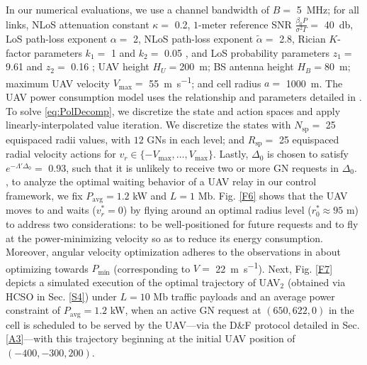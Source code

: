 \documentclass[10pt, twocolumn]{IEEEtran}
\theoremstyle{plain}
\theoremstyle{definition}
\theoremstyle{remark}
\begin{document}
In our numerical evaluations, we use a channel bandwidth of $B=$ \qty[mode=text]{5}{\mega\hertz}; for all links, NLoS attenuation constant $\kappa=$ \qty[mode=text]{0.2}{}, $1$-meter reference SNR $\frac{\beta_{0}P}{\sigma^{2}\Gamma}=$ \qty[mode=text]{40}{\decibel}, LoS path-loss exponent $\alpha=$ \qty[mode=text]{2}{}, NLoS path-loss exponent $\tilde{\alpha}=$ \qty[mode=text]{2.8}{}, Rician $K$-factor parameters $k_{1}=$ \qty[mode=text]{1}{} and $k_{2}=$ \qty[mode=text]{0.05}{} \cite{Rician}, and LoS probability parameters $z_{1}=$ \qty[mode=text]{9.61}{} and $z_{2}=$ \qty[mode=text]{0.16}{} \cite{OptimalAltitude}; UAV height $H_{U}=$\qty[mode=text]{200}{\meter}; BS antenna height $H_{B}=$\qty[mode=text]{80}{\meter}; maximum UAV velocity $V_{\mathrm{max}}=$ \qty[mode=text]{55}{\meter\per\second}; and cell radius $a=$ \qty[mode=text]{1000}{\meter}. The UAV power consumption model uses the relationship and parameters detailed in \cite{SCA}. To solve \eqref{eq:PolDecomp}, we discretize the state and action spaces and apply linearly-interpolated value iteration. We discretize the states with $N_{\mathrm{sp}}=$ \qty[mode=text]{25}{} equispaced radii values, with $12$ GNs in each level; and $R_{\mathrm{sp}}=$ \qty[mode=text]{25}{} equispaced radial velocity actions for $v_r{\in}\{-V_{\mathrm{max}},{\dots},V_{\mathrm{max}}\}$. Lastly, $\Delta_{0}$ is chosen to satisfy $e^{-\Lambda'\Delta_{0}}{=}$ \qty[mode=text]{0.93}{}, such that it is unlikely to receive two or more GN requests in $\Delta_{0}$.\\
, to analyze the optimal waiting behavior of a UAV relay in our control framework, we fix $P_{\mathrm{avg}}{=}1.2$ kW and $L{=}1$ Mb. Fig. \ref{F6} shows that the UAV moves to and waits ($v_{r}^{*}{=}0$) by flying around an optimal radius level ($r_{0}^{*}{\approx}95$ m) to address two considerations: to be well-positioned for future requests and to fly at the power-minimizing velocity so as to reduce its energy consumption. Moreover, angular velocity optimization adheres to the observations in \cite{SCA} about optimizing towards $P_{\mathrm{min}}$ (corresponding to $V{=}$ \qty[mode=text]{22}{\meter\per\second}). Next, Fig. \ref{F7} depicts a simulated execution of the optimal trajectory of UAV$_{2}$ (obtained via HCSO in Sec. \ref{S4}) under $L{=}10$ Mb traffic payloads and an average power constraint of $P_{\text{avg}}{=}1.2$ kW, when an active GN request at $(650,622,0)$ in the cell is scheduled to be served by the UAV---via the D\&F protocol detailed in Sec. \ref{A3}---with this trajectory beginning at the initial UAV position of $(-400,-300,200)$.
\end{document}

